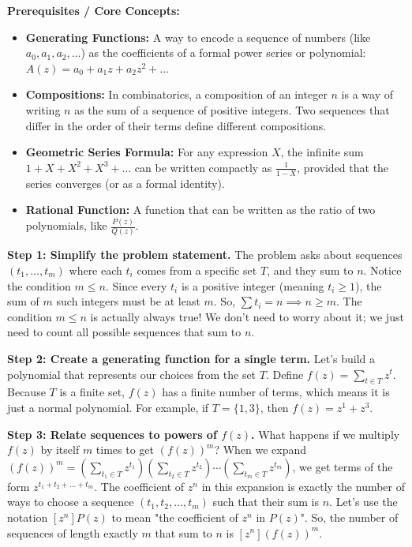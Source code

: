 \begin{solution}
\textbf{Prerequisites / Core Concepts:}
\begin{itemize}
    \item \textbf{Generating Functions:} A way to encode a sequence of numbers (like $a_0, a_1, a_2, \dots$) as the coefficients of a formal power series or polynomial: $A(z) = a_0 + a_1 z + a_2 z^2 + \dots$
    \item \textbf{Compositions:} In combinatorics, a composition of an integer $n$ is a way of writing $n$ as the sum of a sequence of positive integers. Two sequences that differ in the order of their terms define different compositions.
    \item \textbf{Geometric Series Formula:} For any expression $X$, the infinite sum $1 + X + X^2 + X^3 + \dots$ can be written compactly as $\frac{1}{1 - X}$, provided that the series converges (or as a formal identity).
    \item \textbf{Rational Function:} A function that can be written as the ratio of two polynomials, like $\frac{P(z)}{Q(z)}$.
\end{itemize}

\textbf{Step 1: Simplify the problem statement.}
The problem asks about sequences $(t_1, \dots, t_m)$ where each $t_i$ comes from a specific set $T$, and they sum to $n$.
Notice the condition $m \leq n$. Since every $t_i$ is a positive integer (meaning $t_i \geq 1$), the sum of $m$ such integers must be at least $m$. So, $\sum t_i = n \implies n \geq m$. The condition $m \leq n$ is actually always true! We don't need to worry about it; we just need to count all possible sequences that sum to $n$.

\textbf{Step 2: Create a generating function for a single term.}
Let's build a polynomial that represents our choices from the set $T$.
Define $f(z) = \sum_{t \in T} z^t$.
Because $T$ is a finite set, $f(z)$ has a finite number of terms, which means it is just a normal polynomial. For example, if $T = \{1, 3\}$, then $f(z) = z^1 + z^3$.

\textbf{Step 3: Relate sequences to powers of $f(z)$.}
What happens if we multiply $f(z)$ by itself $m$ times to get $(f(z))^m$?
When we expand $(f(z))^m = (\sum_{t_1 \in T} z^{t_1})(\sum_{t_2 \in T} z^{t_2}) \cdots (\sum_{t_m \in T} z^{t_m})$, we get terms of the form $z^{t_1 + t_2 + \dots + t_m}$.
The coefficient of $z^n$ in this expansion is exactly the number of ways to choose a sequence $(t_1, t_2, \dots, t_m)$ such that their sum is $n$.
Let's use the notation $[z^n] P(z)$ to mean "the coefficient of $z^n$ in $P(z)$".
So, the number of sequences of length exactly $m$ that sum to $n$ is $[z^n](f(z))^m$.


\end{solution}

